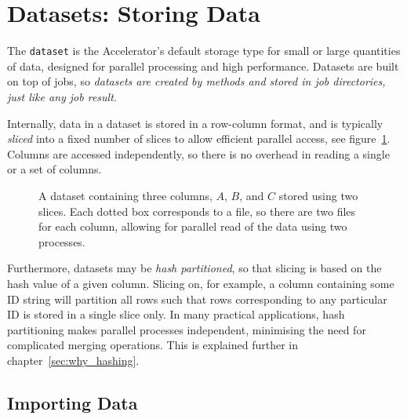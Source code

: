 \section{Datasets: Storing Data}

The \texttt{dataset} is the Accelerator's default storage type for
small or large quantities of data, designed for parallel processing
and high performance.  Datasets are built on top of jobs, so
\emph{datasets are created by methods and stored in job directories,
  just like any job result.}

Internally, data in a dataset is stored in a row-column format, and is
typically \emph{sliced} into a fixed number of slices to allow
efficient parallel access, see figure~\ref{fig:dataset}. Columns are
accessed independently, so there is no overhead in reading a single or
a set of columns.


\begin{figure}[h!]
  \begin{center}
    
    \caption{A dataset containing three columns, $A$, $B$, and $C$
      stored using two slices.  Each dotted box corresponds to a file,
      so there are two files for each column, allowing for parallel
      read of the data using two processes.}
    \label{fig:dataset}
  \end{center}
\end{figure}

Furthermore, datasets may be \textsl{hash partitioned}, so that
slicing is based on the hash value of a given column.  Slicing on, for
example, a column containing some ID string will partition all rows
such that rows corresponding to any particular ID is stored in a
single slice only.  In many practical applications, hash partitioning
makes parallel processes independent, minimising the need for
complicated merging operations.  This is explained further in
chapter~\ref{sec:why_hashing}.



\subsection{Importing Data}

